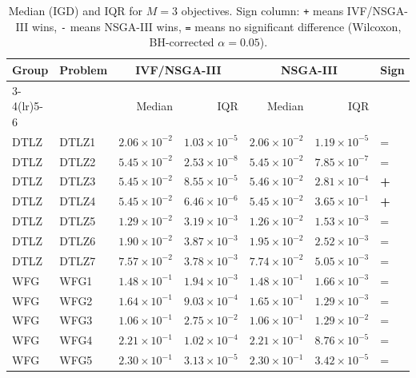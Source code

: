 \begin{table}[t]
\centering
\caption{Median (IGD) and IQR for $M=3$ objectives. Sign column: \texttt{+} means IVF/NSGA-III wins, \texttt{-} means NSGA-III wins, \texttt{=} means no significant difference (Wilcoxon, BH-corrected $\alpha=0.05$).}
\label{tab:igd_m3_ivfnsga-iii}
\scriptsize
\begin{tabular}{llrrrrl}
\toprule
Group & Problem & \multicolumn{2}{c}{IVF/NSGA-III} & \multicolumn{2}{c}{NSGA-III} & Sign \\
\cmidrule(lr){3-4}\cmidrule(lr){5-6}
 & & Median & IQR & Median & IQR & \\
\midrule
DTLZ & DTLZ1 & $2.06\!\times\!10^{-2}$ & $1.03\!\times\!10^{-5}$ & $2.06\!\times\!10^{-2}$ & $1.19\!\times\!10^{-5}$ & = \\
DTLZ & DTLZ2 & $5.45\!\times\!10^{-2}$ & $2.53\!\times\!10^{-8}$ & $5.45\!\times\!10^{-2}$ & $7.85\!\times\!10^{-7}$ & = \\
DTLZ & DTLZ3 & $5.45\!\times\!10^{-2}$ & $8.55\!\times\!10^{-5}$ & $5.46\!\times\!10^{-2}$ & $2.81\!\times\!10^{-4}$ & \textbf{+} \\
DTLZ & DTLZ4 & $5.45\!\times\!10^{-2}$ & $6.46\!\times\!10^{-6}$ & $5.45\!\times\!10^{-2}$ & $3.65\!\times\!10^{-1}$ & \textbf{+} \\
DTLZ & DTLZ5 & $1.29\!\times\!10^{-2}$ & $3.19\!\times\!10^{-3}$ & $1.26\!\times\!10^{-2}$ & $1.53\!\times\!10^{-3}$ & = \\
DTLZ & DTLZ6 & $1.90\!\times\!10^{-2}$ & $3.87\!\times\!10^{-3}$ & $1.95\!\times\!10^{-2}$ & $2.52\!\times\!10^{-3}$ & = \\
DTLZ & DTLZ7 & $7.57\!\times\!10^{-2}$ & $3.78\!\times\!10^{-3}$ & $7.74\!\times\!10^{-2}$ & $5.05\!\times\!10^{-3}$ & = \\
\addlinespace
WFG & WFG1 & $1.48\!\times\!10^{-1}$ & $1.94\!\times\!10^{-3}$ & $1.48\!\times\!10^{-1}$ & $1.66\!\times\!10^{-3}$ & = \\
WFG & WFG2 & $1.64\!\times\!10^{-1}$ & $9.03\!\times\!10^{-4}$ & $1.65\!\times\!10^{-1}$ & $1.29\!\times\!10^{-3}$ & = \\
WFG & WFG3 & $1.06\!\times\!10^{-1}$ & $2.75\!\times\!10^{-2}$ & $1.06\!\times\!10^{-1}$ & $1.29\!\times\!10^{-2}$ & = \\
WFG & WFG4 & $2.21\!\times\!10^{-1}$ & $1.02\!\times\!10^{-4}$ & $2.21\!\times\!10^{-1}$ & $8.76\!\times\!10^{-5}$ & = \\
WFG & WFG5 & $2.30\!\times\!10^{-1}$ & $3.13\!\times\!10^{-5}$ & $2.30\!\times\!10^{-1}$ & $3.42\!\times\!10^{-5}$ & = \\

\end{tabular}
\end{table}

